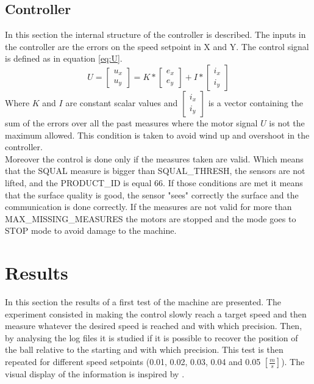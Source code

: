 \documentclass[12pt,a4paper, twoside]{article}
\begin{document}
\subsection{Controller} \label{sec:controller}
In this section the internal structure of the controller is described.
The inputs in the controller are the errors on the speed setpoint in X and Y. The control signal is defined as in equation \ref{eq:U}.
\begin{equation}\label{eq:U}
U = 
\begin{bmatrix}
u_x\\
u_y
\end{bmatrix}
= K * 
\begin{bmatrix}
e_x\\
e_y
\end{bmatrix} + I *
\begin{bmatrix}
i_x\\
i_y
\end{bmatrix} 
\end{equation}
Where $K$ and $I$ are constant scalar values and $\begin{bmatrix}i_x\\i_y\end{bmatrix}$ is a vector containing the sum of the errors over all the past measures where the motor signal $U$ is not the maximum allowed. This condition is taken to avoid wind up and overshoot in the controller.\\
Moreover the control is done only if the measures taken are valid. Which means that the SQUAL measure is bigger than SQUAL\_THRESH, the sensors are not lifted, and the PRODUCT\_ID is equal 66.
If those conditions are met it means that the surface quality is good, the sensor "sees" correctly the surface and the communication is done correctly.
If the measures are not valid for more than MAX\_MISSING\_MEASURES the motors are stopped and the mode goes to STOP mode to avoid damage to the machine.
\section{Results} \label{sec:results}
In this section the results of a first test of the machine are presented. The experiment consisted in making the control slowly reach a target speed and then measure whatever the desired speed is reached and with which precision. Then, by analysing the log files it is studied if it is possible to recover the position of the ball relative to the starting and with which precision. This test is then repeated for different speed setpoints (0.01, 0.02, 0.03, 0.04 and 0.05 $[\frac{m}{s}]$). The visual display of the information is inspired by \cite{Tufte}.
\end{document}
